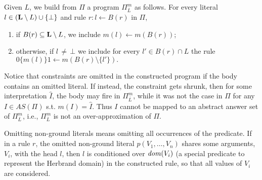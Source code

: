 \documentclass{new_tlp}
\newcommand{\nqbls}{\vspace*{-0.25\baselineskip}}
\def\mi#1{\mathit{#1\/}}
\def\be{\begin{enumerate}}
\def\ee{\end{enumerate}}
\begin{document}
Given $L$, we build from $\Pi$ a program $\Pi_{\overline{L}}^m$ %
as follows. For every literal $l \in ({\bf L} \setminus L) \cup \{\bot \}$ and rule %
$r: l \leftarrow B(r)$ in $\Pi$, 
\be[(1)]
\itemsep=2pt
\item if $ B(r) \subseteq {\bf L} \setminus L$, we include $m(l)
  \leftarrow m(B(r))$;
\item otherwise,  if $l\,{\neq}\,\bot$ we include for every $l' \in B(r) \cap
  L$ the rule $0 \{ m(l) \} 1 \leftarrow m(B(r)\setminus \{l'\}).$
\ee
%
Notice that constraints are omitted in the constructed program if the body contains an omitted literal. If instead, the constraint gets shrunk, then for some interpretation $\widehat{I}$, the body may fire in $\Pi_{\overline{L}}^m$, while it was not the case in $\Pi$ for any $I \in AS(\Pi)$ s.t. $m(I)=\widehat{I}$. Thus 
$I$ cannot be mapped to an abstract answer set of $\Pi_{\overline{L}}^m$, i.e., $\Pi_{\overline{L}}^m$ is not an over-approximation of $\Pi$.

Omitting non-ground literals means omitting %
all occurrences of the predicate. %
If in a rule $r$, the omitted non-ground literal $p(V_1,\dots,V_n)$ shares some arguments, $V_i$, with the head $l$, then $l$ is conditioned over $\mi{dom}(V_i)$ (a special predicate to represent the Herbrand domain) in the constructed rule, so that all values of $V_i$ are considered.
\end{document}
